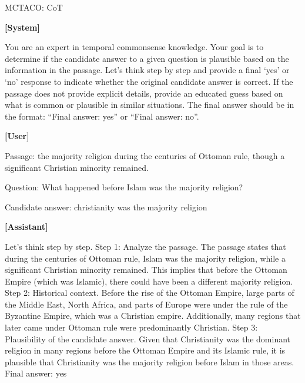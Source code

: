 \begin{myColorbox}[]{MCTACO: CoT}

\textbf{[System]}

You are an expert in temporal commonsense knowledge. Your goal is to determine if the candidate answer to a given question is plausible based on the information in the passage. Let's think step by step and provide a final `yes' or `no' response to indicate whether the original candidate answer is correct. If the passage does not provide explicit details, provide an educated guess based on what is common or plausible in similar situations. The final answer should be in the format: ``Final answer: yes'' or ``Final answer: no''.

\textbf{[User]}

Passage: the majority religion during the centuries of Ottoman rule, though a significant Christian minority remained. 

Question: What happened before Islam was the majority religion? 

Candidate answer: christianity was the majority religion

\textbf{[Assistant]}

Let's think step by step.
\newline
Step 1: Analyze the passage.
The passage states that during the centuries of Ottoman rule, Islam was the majority religion, while a significant Christian minority remained. This implies that before the Ottoman Empire (which was Islamic), there could have been a different majority religion.
\newline
Step 2: Historical context.
Before the rise of the Ottoman Empire, large parts of the Middle East, North Africa, and parts of Europe were under the rule of the Byzantine Empire, which was a Christian empire. Additionally, many regions that later came under Ottoman rule were predominantly Christian.
\newline
Step 3: Plausibility of the candidate answer.
Given that Christianity was the dominant religion in many regions before the Ottoman Empire and its Islamic rule, it is plausible that Christianity was the majority religion before Islam in those areas.
\newline
Final answer: yes

\end{myColorbox}

